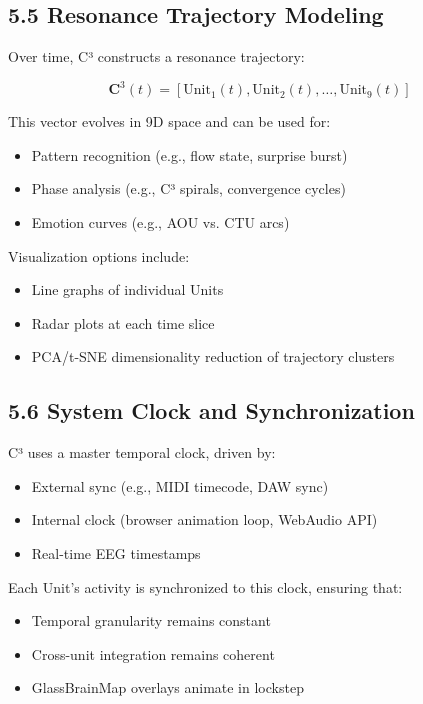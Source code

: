 \subsection*{5.5 Resonance Trajectory Modeling}

Over time, C³ constructs a resonance trajectory:

\[
\mathbf{C}^3(t) = [\text{Unit}_1(t), \text{Unit}_2(t), \ldots, \text{Unit}_9(t)]
\]

This vector evolves in 9D space and can be used for:

\begin{itemize}
    \item Pattern recognition (e.g., flow state, surprise burst)
    \item Phase analysis (e.g., C³ spirals, convergence cycles)
    \item Emotion curves (e.g., AOU vs. CTU arcs)
\end{itemize}

Visualization options include:

\begin{itemize}
    \item Line graphs of individual Units
    \item Radar plots at each time slice
    \item PCA/t-SNE dimensionality reduction of trajectory clusters
\end{itemize}

\subsection*{5.6 System Clock and Synchronization}

C³ uses a master temporal clock, driven by:

\begin{itemize}
    \item External sync (e.g., MIDI timecode, DAW sync)
    \item Internal clock (browser animation loop, WebAudio API)
    \item Real-time EEG timestamps
\end{itemize}

Each Unit’s activity is synchronized to this clock, ensuring that:

\begin{itemize}
    \item Temporal granularity remains constant
    \item Cross-unit integration remains coherent
    \item GlassBrainMap overlays animate in lockstep
\end{itemize}

